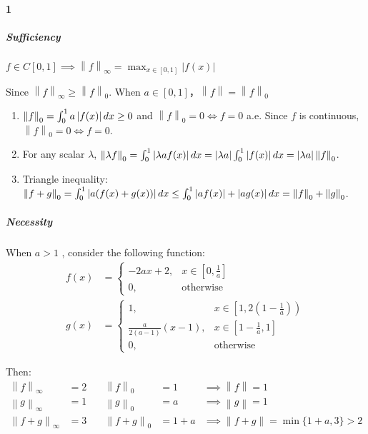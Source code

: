 \documentclass{ctexart}
\begin{document}
\paragraph{1}
\subparagraph{Sufficiency}
\(f \in C[0,1] \implies \left\| f \right\|_{\infty } = \max_{x \in
[0,1]} |f(x)|\)

Since \(\left\| f \right\|_{\infty} \geq \left\| f \right\|_{0}\). When
\(a \in [0,1]\)，\(\left\| f \right\| = \left\| f \right\|_{0}\)

\begin{enumerate}
    \item \(\left\| f \right\|_{0} = \int_{0}^{1} a\left|f(x)\right| dx
        \geq 0\) and \(\left\| f \right\|_{0} = 0 \iff f = 0\) a.e.
        Since \(f\) is continuous, \(\left\| f \right\|_{0} = 0 \iff f = 0\).
    \item For any scalar \(\lambda\), \(\left\| \lambda f \right\|_{0} =
            \int_{0}^{1} \left|\lambda a f(x)\right| dx = \left|\lambda a\right|
            \int_{0}^{1} \left|f(x)\right| dx = \left|\lambda a\right| \left\| f
        \right\|_{0}\).
    \item Triangle inequality: \(\left\| f + g \right\|_{0} =
            \int_{0}^{1} \left|a(f(x) + g(x))\right| dx \leq
            \int_{0}^{1} \left|af(x)\right| + \left|ag(x)\right| dx = \left\| f
        \right\|_{0} + \left\| g \right\|_{0}\).

\end{enumerate}

\subparagraph{Necessity}

When \(a > 1\) , consider the following function:
\begin{align*}
    f(x) &=
    \begin{cases}
        -2ax + 2, & x \in \left[ 0, \frac{1}{a} \right] \\
        0, & \text{otherwise}
    \end{cases} \\
    g(x) &=
    \begin{cases}
        1, & x \in \left[1, 2\left( 1-\frac{1}{a} \right)\right) \\
        \frac{a}{2(a-1)}(x-1), & x \in \left[ 1-\frac{1}{a}, 1 \right] \\
        0, & \text{otherwise}
    \end{cases}
\end{align*}

Then:
\begin{align*}
    \left\| f \right\|_{\infty} &= 2 &\quad \left\| f \right\|_{0} &= 1
    &\implies \left\| f \right\| = 1\\
    \left\| g \right\|_{\infty} &= 1 &\quad \left\| g \right\|_{0} &= a
    &\implies \left\| g \right\| = 1\\
    \left\| f + g \right\|_{\infty} &= 3 &\quad \left\| f + g
    \right\|_{0} &= 1+a &\implies \left\| f + g \right\| = \min \{1+a,3\} > 2
\end{align*}
\end{document}
